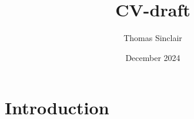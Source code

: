 \documentclass{article}
\title{CV-draft}
\author{Thomas Sinclair}
\date{December 2024}
\begin{document}
\maketitle

\section{Introduction}
\end{document}
